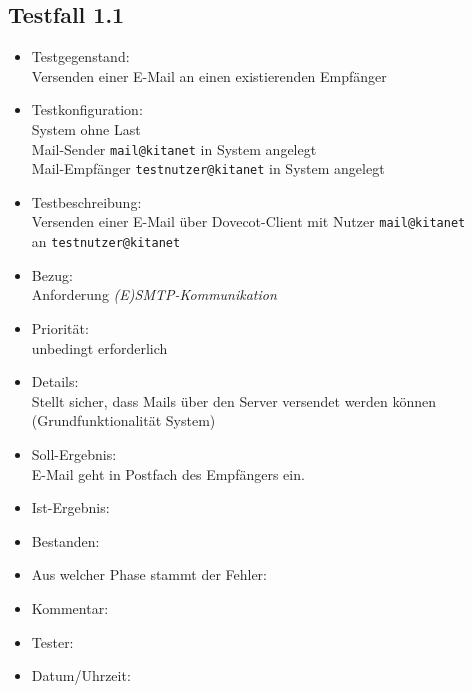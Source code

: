 \subsection{Testfall 1.1}
\begin{itemize}
	\item Testgegenstand:\\
	Versenden einer E-Mail an einen existierenden Empfänger
	\item Testkonfiguration:\\
	System ohne Last\\
	Mail-Sender \verb+mail@kitanet+ in System angelegt\\
	Mail-Empfänger \verb+testnutzer@kitanet+ in System angelegt
	\item Testbeschreibung:\\
	Versenden einer E-Mail über Dovecot-Client mit Nutzer \verb+mail@kitanet+ \\ an \verb+testnutzer@kitanet+
	\item Bezug:\\
	Anforderung \textit{(E)SMTP-Kommunikation}
	\item Priorität:\\
	unbedingt erforderlich
	\item Details:\\
	Stellt sicher, dass Mails über den Server versendet werden können (Grundfunktionalität System)
	\item Soll-Ergebnis:\\
	E-Mail geht in Postfach des Empfängers ein.
	\item Ist-Ergebnis:\\
	\item Bestanden:\\
	\item Aus welcher Phase stammt der Fehler:\\
	\item Kommentar:\\
	\item Tester:\\
	\item Datum/Uhrzeit:\\
\end{itemize}

